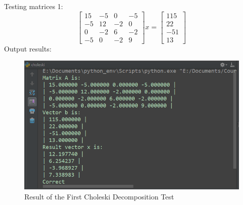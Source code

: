 \documentclass[a4paper,titlepage]{article}
\begin{document}
			Testing matrices 1:
			$$
				\begin{bmatrix}
				15 & -5 & 0 & -5 \\
				-5 & 12 & -2 & 0 \\
				0 & -2 & 6 & -2 \\
				-5 & 0 & -2 & 9
				\end{bmatrix} x =
				\begin{bmatrix}
				115\\
				22\\
				-51\\
				13
				\end{bmatrix}
			$$
			Output results:
			\begin{figure}[!h]
				\centering
				\includegraphics[width=\linewidth]{chol_1_result}
				\caption{Result of the First Choleski Decomposition Test}
				\label{chol_1_result}
			\end{figure}
		
\end{document}
